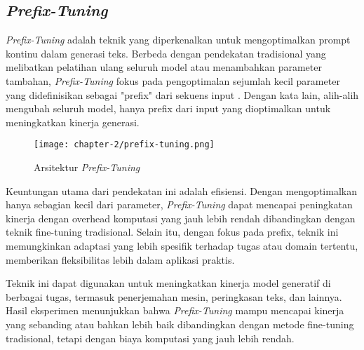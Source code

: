\subsection{\textit{Prefix-Tuning}}

\textit{Prefix-Tuning} adalah teknik yang diperkenalkan untuk mengoptimalkan prompt kontinu dalam generasi teks. Berbeda dengan pendekatan tradisional yang melibatkan pelatihan ulang seluruh model atau menambahkan parameter tambahan, \textit{Prefix-Tuning} fokus pada pengoptimalan sejumlah kecil parameter yang didefinisikan sebagai "prefix" dari sekuens input \parencite{prefix_tuning}. Dengan kata lain, alih-alih mengubah seluruh model, hanya prefix dari input yang dioptimalkan untuk meningkatkan kinerja generasi.

\begin{figure}[ht]
    \centering
    \texttt{[image: chapter-2/prefix-tuning.png]}
    \caption{Arsitektur \textit{Prefix-Tuning} \parencite{prefix_tuning}}
    \label{fig:prefix-tuning}
\end{figure}

Keuntungan utama dari pendekatan ini adalah efisiensi. Dengan mengoptimalkan hanya sebagian kecil dari parameter, \textit{Prefix-Tuning} dapat mencapai peningkatan kinerja dengan overhead komputasi yang jauh lebih rendah dibandingkan dengan teknik fine-tuning tradisional. Selain itu, dengan fokus pada prefix, teknik ini memungkinkan adaptasi yang lebih spesifik terhadap tugas atau domain tertentu, memberikan fleksibilitas lebih dalam aplikasi praktis.

Teknik ini dapat digunakan untuk meningkatkan kinerja model generatif di berbagai tugas, termasuk penerjemahan mesin, peringkasan teks, dan lainnya. Hasil eksperimen menunjukkan bahwa \textit{Prefix-Tuning} mampu mencapai kinerja yang sebanding atau bahkan lebih baik dibandingkan dengan metode fine-tuning tradisional, tetapi dengan biaya komputasi yang jauh lebih rendah.

